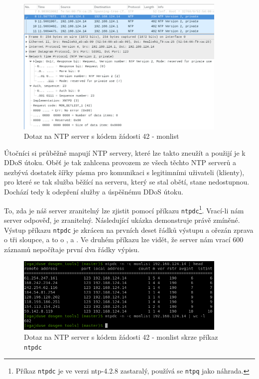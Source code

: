\begin{figure} [ht]
	\centering
	\includegraphics[width=0.9\textwidth]{obrazky/mon_getlist_1_wireshark.png} %
	\caption{Dotaz na NTP server s kódem žádosti 42 - monlist}
	\label{fig:monlist_get_wireshark-img}
\end{figure}

Útočníci si průběžně mapují NTP servery, které lze takto zneužít a použijí je k 
DDoS útoku.
Oběť je tak zahlcena provozem ze všech těchto NTP serverů a nezbývá dostatek šířky
pásma pro komunikaci s legitimními uživateli (klienty), pro které se tak služba běžící na
serveru, který se stal obětí, stane nedostupnou. Dochází tedy k odepření služby a úspěšnému
DDoS útoku.

To, zda je náš server zranitelný lze zjistit pomocí příkazu \texttt{ntpdc}\footnote{Příkaz
\texttt{ntpdc} je ve verzi ntp-4.2.8 zastaralý, používá se \texttt{ntpq} jako náhrada.}.
Vrací-li nám server odpověď, je zranitelný. Následující ukázka demonstruje právě zmíněné.
Výstup příkazu \texttt{ntpdc} je zkrácen na prvních deset řádků výstupu a ořezán zprava o
tři sloupce, a to o ,  a . Ve druhém příkazu lze vidět, že
server nám vrací 600 záznamů nepočítaje první dva řádky výpisu.


%
\begin{figure} [ht]
	\centering
	\includegraphics[width=0.9\textwidth]{obrazky/ntpdc_monlist_terminal_screen.png} %
	\caption{Dotaz na NTP server s kódem žádosti 42 - monlist skrze příkaz \texttt{ntpdc}}
	\label{fig:monlist_get_terminal-img}
\end{figure}

